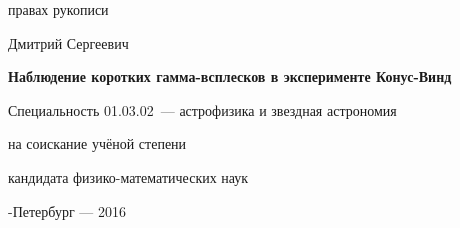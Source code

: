 \fontsize{14pt}{15pt}\selectfont  %
\thispagestyle{empty}

\vspace{10mm}
\begin{flushright}
   правах рукописи
  \textit{}
\end{flushright}

\vspace{30mm}
\begin{center}
{\Large{} Дмитрий Сергеевич}
\end{center}

\vspace{30mm}
\begin{center}
{\bf \LARGE Наблюдение коротких гамма-всплесков в эксперименте Конус-Винд
\par}

\vspace{30mm}
{\Large
Специальность 01.03.02~--- астрофизика и звездная астрономия
}

\vspace{15mm}
\par
{} на соискание учёной степени\par
кандидата физико-математических наук
\end{center}

\vspace{40mm}
\begin{center}
{-Петербург --- 2016}
\end{center}

\newpage


